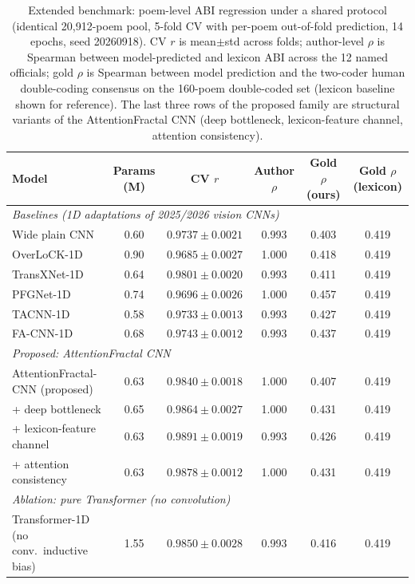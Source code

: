 \documentclass[10pt]{article}
\begin{document}
\begin{table}[H]
\centering\footnotesize
\caption{Extended benchmark: poem-level ABI regression under a shared protocol
(identical 20,912-poem pool, 5-fold CV with per-poem out-of-fold prediction, 14
epochs, seed 20260918). CV $r$ is mean$\pm$std across folds; author-level
$\rho$ is Spearman between model-predicted and lexicon ABI across the 12 named
officials; gold $\rho$ is Spearman between model prediction and the two-coder
human double-coding consensus on the 160-poem double-coded set (lexicon baseline shown for
reference). The last three rows of the proposed family are structural variants of
the AttentionFractal CNN (deep bottleneck, lexicon-feature channel, attention
consistency).}
\label{tab:extbench}
\setlength{\tabcolsep}{3.5pt}
\begin{tabular}{lccccc}
\toprule
Model & Params (M) & CV $r$ & Author $\rho$ & Gold $\rho$ (ours) & Gold $\rho$ (lexicon)\\
\midrule
\multicolumn{6}{l}{\emph{Baselines (1D adaptations of 2025/2026 vision CNNs)}}\\
Wide plain CNN & 0.60 & $0.9737{\pm}0.0021$ & 0.993 & 0.403 & 0.419\\
OverLoCK-1D \citep{overlock2025} & 0.90 & $0.9685{\pm}0.0027$ & 1.000 & 0.418 & 0.419\\
TransXNet-1D \citep{transxnet2025} & 0.64 & $0.9801{\pm}0.0020$ & 0.993 & 0.411 & 0.419\\
PFGNet-1D \citep{pfgn2026} & 0.74 & $0.9696{\pm}0.0026$ & 1.000 & 0.457 & 0.419\\
TACNN-1D \citep{tacnn2026} & 0.58 & $0.9733{\pm}0.0013$ & 0.993 & 0.427 & 0.419\\
FA-CNN-1D \citep{facnn2026} & 0.68 & $0.9743{\pm}0.0012$ & 0.993 & 0.437 & 0.419\\
\multicolumn{6}{l}{\emph{Proposed: AttentionFractal CNN}}\\
AttentionFractal-CNN (proposed) & 0.63 & $0.9840{\pm}0.0018$ & 1.000 & 0.407 & 0.419\\
\quad + deep bottleneck & 0.65 & $0.9864{\pm}0.0027$ & 1.000 & 0.431 & 0.419\\
\quad + lexicon-feature channel & 0.63 & $0.9891{\pm}0.0019$ & 0.993 & 0.426 & 0.419\\
\quad + attention consistency & 0.63 & $0.9878{\pm}0.0012$ & 1.000 & 0.431 & 0.419\\
\multicolumn{6}{l}{\emph{Ablation: pure Transformer (no convolution)}}\\
Transformer-1D (no conv.\ inductive bias) & 1.55 & $0.9850{\pm}0.0028$ & 0.993 & 0.416 & 0.419\\
\bottomrule
\end{tabular}
\end{table}
\end{document}
